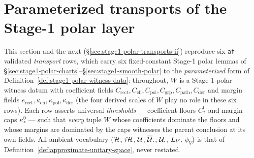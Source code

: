 \section{Parameterized transports of the Stage-1 polar layer}\label{sec:stage1-polar-transports}

This section and the next (\S\ref{sec:stage1-polar-transports-ii}) reproduce six
\texttt{af}-validated \emph{transport} rows, which carry six fixed-constant Stage-1 polar
lemmas of \S\ref{sec:stage1-polar-charts}--\S\ref{sec:stage1-smooth-polar} to the
\emph{parameterized} form of Definition~\ref{def:stage1-polar-witness-data}: throughout, $W$
is a Stage-1 polar witness datum with coefficient fields
$C_{\mathrm{rect}},C_{\mathrm{ch}},C_{\mathrm{pol}},C_{\mathrm{grp}},C_{\mathrm{path}},C_{\mathrm{der}}$
and margin fields $e_{\mathrm{rect}},\kappa_{\mathrm{ch}},\kappa_{\mathrm{pol}},\kappa_{\mathrm{der}}$
(the four derived scales of $W$ play no role in these six rows). Each row asserts universal
\emph{thresholds} --- coefficient floors $C^{0}_{\ast}$ and margin caps $\kappa^{0}_{\ast}$
--- such that \emph{every} tuple $W$ whose coefficients dominate the floors and whose
margins are dominated by the caps witnesses the parent conclusion at its own fields. All
ambient vocabulary ($\mathcal H$, $i\mathcal H$, $\mathcal U$, $\overline{\mathcal U}_{\cdot}$, $\mathcal U_{\cdot}$,
$L_{V}$, $\phi_V$) is that of Definition~\ref{def:approximate-unitary-space}, never
restated.

